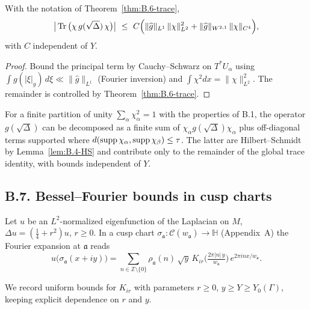 \begin{corollary}\label{cor:B.6-tracebound}
With the notation of Theorem~\ref{thm:B.6-trace},
\[
\big|\operatorname{Tr}\big(\chi\,g(\sqrt\Delta)\,\chi\big)\big|
\ \le\ C \Big( \|\widehat g\|_{L^1}\,\|\chi\|_{L^2}^2 + \|\widehat g\|_{W^{2,1}}\,\|\chi\|_{C^{4}} \Big),
\]
with $C$ independent of $Y$.
\end{corollary}

\begin{proof}
Bound the principal term by Cauchy–Schwarz on $T^*U_\alpha$ using $\int g(|\xi|_g)\,d\xi\ll \|\widehat g\|_{L^1}$ (Fourier inversion) and $\int \chi^2 dx=\|\chi\|_{L^2}^2$. The remainder is controlled by Theorem~\ref{thm:B.6-trace}.
\end{proof}

\begin{remark}\label{rmk:B.6-glue}
For a finite partition of unity $\sum_\alpha \chi_\alpha^2=1$ with the properties of B.1,
the operator $g(\sqrt\Delta)$ can be decomposed as a finite sum of $\chi_\alpha g(\sqrt\Delta)\chi_\alpha$
plus off-diagonal terms supported where $d(\operatorname{supp}\chi_\alpha,\operatorname{supp}\chi_\beta)\le \tau$. The latter are Hilbert–Schmidt by Lemma~\ref{lem:B.4-HS} and contribute only to the remainder of the global trace identity, with bounds independent of $Y$.
\end{remark}

\subsection*{B.7. Bessel--Fourier bounds in cusp charts}

\noindent
Let $u$ be an $L^2$-normalized eigenfunction of the Laplacian on $M$,
$\Delta u=(\tfrac14 + r^2)u$, $r\ge 0$. In a cusp chart
$\sigma_{\mathfrak a}:\mathcal C(w_{\mathfrak a})\to \mathbb H$ (Appendix~A)
the Fourier expansion at $\mathfrak a$ reads
\[
u\big(\sigma_{\mathfrak a}(x+iy)\big)
= \sum_{n\in\mathbb Z\setminus\{0\}} \rho_{\mathfrak a}(n)\,
\sqrt{y}\, K_{i r}\!\Big(\tfrac{2\pi |n|\, y}{w_{\mathfrak a}}\Big)\,
e^{2\pi i n x / w_{\mathfrak a}}.
\]

We record uniform bounds for $K_{i r}$ with parameters $r\ge 0$, $y\ge Y\ge Y_0(\Gamma)$,
keeping explicit dependence on $r$ and $y$.


